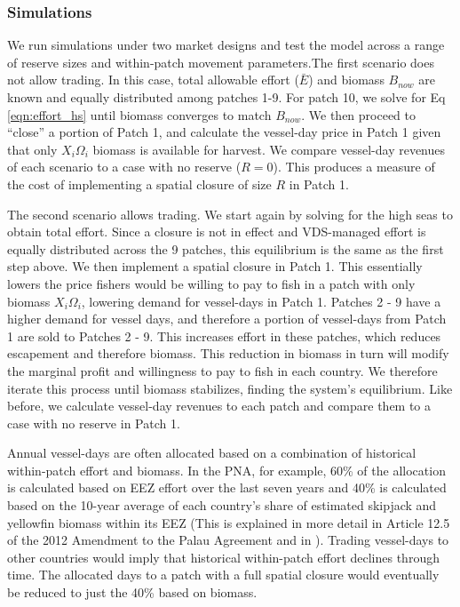 \documentclass[12pt]{article}
\begin{document}
\subsubsection{Simulations}

We run simulations under two market designs and test the model across a range of reserve sizes and within-patch movement parameters.The first scenario does not allow trading. In this case, total allowable effort ($\bar{E}$) and biomass $B_{now}$ are known and equally distributed among patches 1-9. For patch 10, we solve for Eq \ref{eqn:effort_hs} until biomass converges to match $B_{now}$. We then proceed to ``close'' a portion of Patch 1, and calculate the vessel-day price in Patch 1 given that only $X_i\Omega_i$ biomass is available for harvest. We compare vessel-day revenues of each scenario to a case with no reserve ($R = 0$). This produces a measure of the cost of implementing a spatial closure of size $R$ in Patch 1.

The second scenario allows trading. We start again by solving for the high seas to obtain total effort. Since a closure is not in effect and VDS-managed effort is equally distributed across the 9 patches, this equilibrium is the same as the first step above. We then implement a spatial closure in Patch 1. This essentially lowers the price fishers would be willing to pay to fish in a patch with only biomass $X_i\Omega_i$, lowering demand for vessel-days in Patch 1. Patches 2 - 9 have a higher demand for vessel days, and therefore a portion of vessel-days from Patch 1 are sold to Patches 2 - 9. This increases effort in these patches, which reduces escapement and therefore biomass. This reduction in biomass in turn will modify the marginal profit and willingness to pay to fish in each country. We therefore iterate this process until biomass stabilizes, finding the system's equilibrium. Like before, we calculate vessel-day revenues to each patch and compare them to a case with no reserve in Patch 1.

Annual vessel-days are often allocated based on a combination of historical within-patch effort and biomass. In the PNA, for example, 60\% of the allocation is calculated based on EEZ effort over the last seven years and 40\% is calculated based on the 10-year average of each country’s share of estimated skipjack and yellowfin biomass within its EEZ (This is explained in more detail in Article 12.5 of the 2012 Amendment to the Palau Agreement and in \cite{Hagrannsoknir2014}). Trading vessel-days to other countries would imply that historical within-patch effort declines through time. The allocated days to a patch with a full spatial closure would eventually be reduced to just the 40\% based on biomass.
\end{document}
